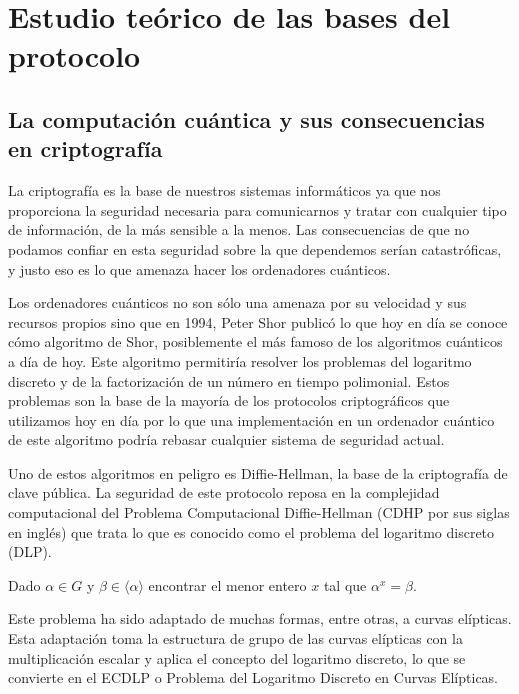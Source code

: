 \chapter{Estudio teórico de las bases del protocolo}\label{estudioteorico}

%
%

\section{La computación cuántica y sus consecuencias en criptografía }

La criptografía es la base de nuestros sistemas informáticos ya que nos proporciona la seguridad necesaria para comunicarnos y tratar con cualquier tipo de información, de la más sensible a la menos. Las consecuencias de que no podamos confiar en esta seguridad sobre la que dependemos serían catastróficas, y justo eso es lo que amenaza hacer los ordenadores cuánticos.

Los ordenadores cuánticos no son sólo una amenaza por su velocidad y sus recursos propios sino que en 1994, Peter Shor publicó lo que hoy en día se conoce cómo algoritmo de Shor, posiblemente el más famoso de los algoritmos cuánticos a día de hoy. Este algoritmo permitiría resolver los problemas del logaritmo discreto y de la factorización de un número en tiempo polimonial. Estos problemas son la base de la mayoría de los protocolos criptográficos que utilizamos hoy en día por lo que una implementación en un ordenador cuántico de este algoritmo podría rebasar cualquier sistema de seguridad actual.

Uno de estos algoritmos en peligro es Diffie-Hellman, la base de la criptografía de clave pública. La seguridad de este protocolo reposa en la complejidad computacional del Problema Computacional Diffie-Hellman (CDHP por sus siglas en inglés) que trata lo que es conocido como el problema del logaritmo discreto (DLP).

\begin{problem}
    Dado $\alpha \in G$ y $\beta \in \langle \alpha \rangle$ encontrar el menor entero $x$ tal que $\alpha^x = \beta$. \cite{discrete-logarithm}
\end{problem}

Este problema ha sido adaptado de muchas formas, entre otras, a curvas elípticas. Esta adaptación toma la estructura de grupo de las curvas elípticas con la multiplicación escalar y aplica el concepto del logaritmo discreto, lo que se convierte en el ECDLP o Problema del Logaritmo Discreto en Curvas Elípticas.

